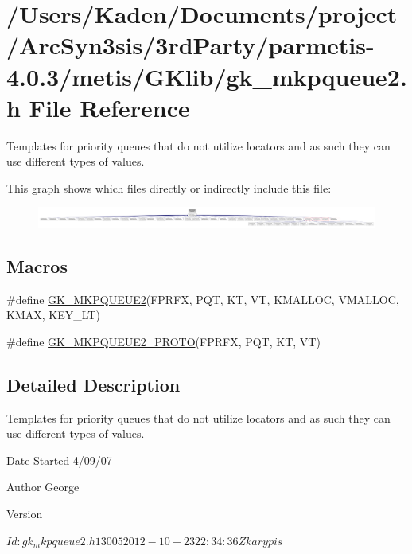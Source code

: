 \hypertarget{a00065}{}\section{/\+Users/\+Kaden/\+Documents/project/\+Arc\+Syn3sis/3rd\+Party/parmetis-\/4.0.3/metis/\+G\+Klib/gk\+\_\+mkpqueue2.h File Reference}
\label{a00065}


Templates for priority queues that do not utilize locators and as such they can use different types of values.  


This graph shows which files directly or indirectly include this file\+:\nopagebreak
\begin{figure}[H]
\begin{center}
\leavevmode
\includegraphics[width=350pt]{a00067}
\end{center}
\end{figure}
\subsection*{Macros}
\begin{DoxyCompactItemize}
\item 
\#define \hyperlink{a00065_a13c3e14612a115100f7fabad87f23b6f}{G\+K\+\_\+\+M\+K\+P\+Q\+U\+E\+U\+E2}(F\+P\+R\+FX,  P\+QT,  KT,  VT,  K\+M\+A\+L\+L\+OC,  V\+M\+A\+L\+L\+OC,  K\+M\+AX,  K\+E\+Y\+\_\+\+LT)
\item 
\#define \hyperlink{a00065_a739a2bbe026fd93c093beb421c08263a}{G\+K\+\_\+\+M\+K\+P\+Q\+U\+E\+U\+E2\+\_\+\+P\+R\+O\+TO}(F\+P\+R\+FX,  P\+QT,  KT,  VT)
\end{DoxyCompactItemize}


\subsection{Detailed Description}
Templates for priority queues that do not utilize locators and as such they can use different types of values. 

\begin{DoxyDate}{Date}
Started 4/09/07 
\end{DoxyDate}
\begin{DoxyAuthor}{Author}
George 
\end{DoxyAuthor}
\begin{DoxyVersion}{Version}
\begin{DoxyVerb}$Id: gk_mkpqueue2.h 13005 2012-10-23 22:34:36Z karypis $ \end{DoxyVerb}
 
\end{DoxyVersion}



